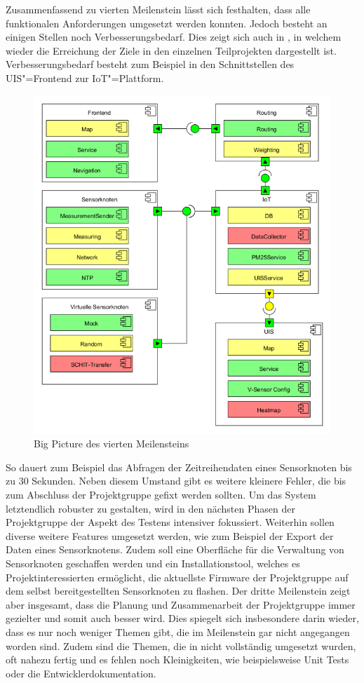 Zusammenfassend zu vierten Meilenstein lässt sich festhalten, dass alle funktionalen Anforderungen umgesetzt werden konnten.
Jedoch besteht an einigen Stellen noch Verbesserungsbedarf.
Dies zeigt sich auch in , in welchem wieder die Erreichung der Ziele in den einzelnen Teilprojekten dargestellt ist.
Verbesserungsbedarf besteht zum Beispiel in den Schnittstellen des UIS"=Frontend zur IoT"=Plattform.

\begin{figure}[!htb]
	\centering
	\includegraphics[width=\textwidth]{./ressourcen/bigpicture3.png}
	\caption{Big Picture des vierten Meilensteins}
	\label{fig:bigpicture3}
\end{figure}

So dauert zum Beispiel das Abfragen der Zeitreihendaten eines Sensorknoten bis zu 30 Sekunden.
Neben diesem Umstand gibt es weitere kleinere Fehler, die bis zum Abschluss der Projektgruppe gefixt werden sollten.
Um das System letztendlich robuster zu gestalten, wird in den nächsten Phasen der Projektgruppe der Aspekt des Testens intensiver fokussiert.
Weiterhin sollen diverse weitere Features umgesetzt werden, wie zum Beispiel der Export der Daten eines Sensorknotens.
Zudem soll eine Oberfläche für die Verwaltung von Sensorknoten geschaffen werden und ein Installationstool, welches es Projektinteressierten ermöglicht, die aktuellste Firmware der Projektgruppe auf dem selbst bereitgestellten Sensorknoten zu flashen.
Der dritte Meilenstein zeigt aber insgesamt, dass die Planung und Zusammenarbeit der Projektgruppe immer gezielter und somit auch besser wird.
Dies spiegelt sich insbesondere darin wieder, dass es nur noch weniger Themen gibt, die im Meilenstein gar nicht angegangen worden sind.
Zudem sind die Themen, die in  nicht vollständig umgesetzt wurden, oft nahezu fertig und es fehlen noch Kleinigkeiten, wie beispielsweise Unit Tests oder die Entwicklerdokumentation.